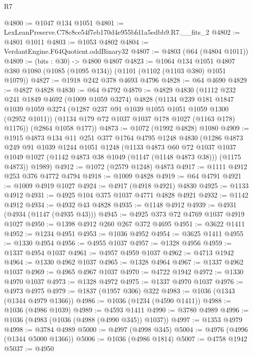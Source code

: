 \begin{lexlean}{R7}
\begin{coremodule}
@4800 := @1047 @134 @1051
@4801 := LexLeanPreserve.C78c8ce54f7eb170d4e955bfd1a5edbb9.R7.__fits_2
@4802 := @4801 @1011
@4803 := @1053 @4802
@4804 := VerdantEngine.F64Quotient.oddBinary32
@4807 := @4803 (@64 (@4804 @1011))
@4809 := (bits : @30) -> @4800 @4807
@4823 := @1064
    @134
    @1051
    @4807
    @380
    @1080
    (@1085 (@1095 @134))
    (@1101 (@1102 (@1103 @380) @1051 @1079))
@4827 := @1918 @242 @378 @4693 @4796
@4828 := @64 @4690
@4829 := @4827 @4828
@4830 := @64 @4792
@4870 := @4829
    @4830
    (@1112
      @232
      @241
      @1849
      @4692
      (@1009 @1059 @3274)
      @4828
      (@1134
        @239
        @181
        @1847
        @1039
        @1059
        @3274
        (@1287 @237 @91 @1039 @1055 @1051 @1059 @1300 (@2952 @1011))
        (@1134 @179 @72 @1037 @1037 @178 @1027 (@1163 @178) @1176))
      (@2864 @1058 @177))
@4873 := @1072 (@1992 @4828) @1080
@4909 := @1915
    @4873
    @134
    @11
    @251
    @377
    @1764
    @4795
    @1248
    @4830
    (@1286
      @4873
      @249
      @91
      @1039
      @1244
      @1051
      @1248
      (@1133
        @4873
        @60
        @72
        @1037
        @1037
        @1049
        @1027
        (@1142 @4873 @38 @1049 (@1147 (@1148 @4873 @38)))
        (@1175 @4873))
      @1989)
@4912 := @1072 (@2579 @1248) @4873
@4917 := @1111 @4912 @253 @376 @4772 @4794
@4918 := @1009 @4828
@4919 := @64 @4791
@4921 := @1009 @4919 @1027
@4924 := @4917 (@4918 @4921) @4830
@4925 := @1133 @4912
@4931 := @4925 @104 @375 @1037 @4771 @4828 @4921
@4932 := @1142 @4912
@4934 := @4932 @43 @4828
@4935 := @1148 @4912
@4939 := @4931 (@4934 (@1147 (@4935 @43)))
@4945 := @4925 @373 @72 @4769 @1037 @4919 @1027
@4950 := @1398 @4912 @260 @267 @372 @4695
@4951 := @3622 @1411
@4952 := @1234 @4951
@4953 := @1036 @4952
@4954 := @3625 @1411
@4955 := @1330 @4954
@4956 := @4955 @1037
@4957 := @1328 @4956
@4959 := @1337 @4954 @1037
@4961 := @4957 @4959 @1037
@4962 := @4713 @1942
@4964 := @1330 @4962 @1037
@4965 := @1328 @4964
@4967 := @1337 @4962 @1037
@4969 := @4965 @4967 @1037
@4970 := @4722 @1942
@4972 := @1330 @4970 @1037
@4973 := @1328 @4972
@4975 := @1337 @4970 @1037
@4976 := @4973 @4975
@4979 := @1837 (@1957 @306) @322
@4983 := @1036 (@1343 (@1344 @4979 @1366))
@4986 := @1036 (@1234 (@4590 @1411))
@4988 := @1036 (@4986 @1039)
@4989 := @4593 @1411
@4990 := @3780 @4989
@4996 := @1036 (@4983 (@1036 (@4988 (@4990 @345)) @1037))
@4997 := @1353 @4979
@4998 := @3784 @4989
@5000 := @4997 (@4998 @345)
@5004 := @4976 (@4996 (@1344 @5000 @1366))
@5006 := @1036 (@4986 @1814)
@5007 := @4758 @1942
@5037 := @4950

\end{coremodule}
\end{lexlean}
